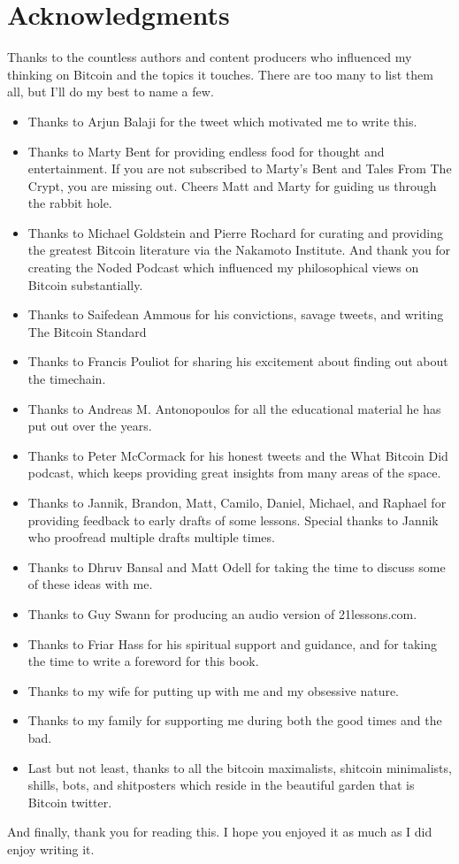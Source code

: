 \chapter*{Acknowledgments}

Thanks to the countless authors and content producers who influenced my thinking
on Bitcoin and the topics it touches. There are too many to list them all, but
I’ll do my best to name a few.

\begin{itemize}
  \item Thanks to Arjun Balaji for the tweet which motivated me to write this.
  \item Thanks to Marty Bent for providing endless food for thought and entertainment. If you are not subscribed to Marty’s Bent and Tales From The Crypt, you are missing out. Cheers Matt and Marty for guiding us through the rabbit hole.
  \item Thanks to Michael Goldstein and Pierre Rochard for curating and providing the greatest Bitcoin literature via the Nakamoto Institute. And thank you for creating the Noded Podcast which influenced my philosophical views on Bitcoin substantially.
  \item Thanks to Saifedean Ammous for his convictions, savage tweets, and writing The Bitcoin Standard
  \item Thanks to Francis Pouliot for sharing his excitement about finding out about the timechain.
  \item Thanks to Andreas M. Antonopoulos for all the educational material he has put out over the years.
  \item Thanks to Peter McCormack for his honest tweets and the What Bitcoin Did podcast, which keeps providing great insights from many areas of the space.
  \item Thanks to Jannik, Brandon, Matt, Camilo, Daniel, Michael, and Raphael for providing feedback to early drafts of some lessons. Special thanks to Jannik who proofread multiple drafts multiple times.
  \item Thanks to Dhruv Bansal and Matt Odell for taking the time to discuss some of these ideas with me.
  \item Thanks to Guy Swann for producing an audio version of 21lessons.com.
  \item Thanks to Friar Hass for his spiritual support and guidance, and for taking the time to write a foreword for this book.
  \item Thanks to my wife for putting up with me and my obsessive nature.
  \item Thanks to my family for supporting me during both the good times and the bad.
  \item Last but not least, thanks to all the bitcoin maximalists, shitcoin minimalists, shills, bots, and shitposters which reside in the beautiful garden that is Bitcoin twitter.
\end{itemize}

And finally, thank you for reading this. I hope you enjoyed it as much as I did enjoy writing it.
